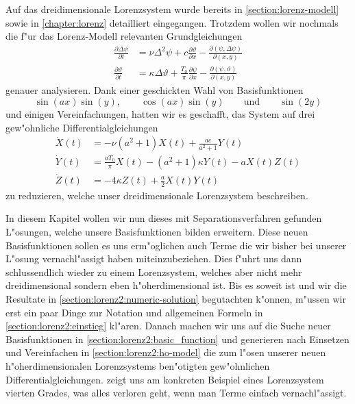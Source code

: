 Auf das dreidimensionale Lorenzsystem wurde bereits in 
\cref{section:lorenz-modell} sowie in \cref{chapter:lorenz} detailliert 
eingegangen. Trotzdem wollen wir nochmals die f"ur das Lorenz-Modell relevanten 
Grundgleichungen
\begin{equation}
	\begin{aligned}
	\frac{\partial\Delta\psi}{\partial t}
	&=
	\nu\Delta^2\psi 
	+c\frac{\partial\vartheta}{\partial x}
	-\frac{\partial(\psi,\Delta\psi)}{\partial(x,y)}
	\\
	\frac{\partial\vartheta}{\partial t}
	&=
	\kappa\Delta\vartheta
	+ \frac{T_0}{\pi}\frac{\partial\psi}{\partial x}
	- \frac{\partial(\psi,\vartheta)}{\partial(x,y)}
	\end{aligned}
	\label{equation:lorenz2:base}
\end{equation}
genauer analysieren. Dank einer geschickten Wahl von Basisfunktionen
\begin{equation*}
	\sin(ax)\sin(y),
	\qquad
	\cos(ax)\sin(y)
	\qquad\text{und}\qquad
	\sin(2y)
\end{equation*}
und einigen Vereinfachungen, hatten wir es geschafft, das System auf drei 
gew"ohnliche Differentialgleichungen
\begin{equation*}
	\begin{aligned}
	\dot X(t)
	&=
	-\nu(a^2+1)X(t)
	+\frac{ac}{a^2+1}Y(t)
	\\
	\dot Y(t)
	&=
	\frac{aT_0}{\pi}X(t)
	-(a^2+1)\kappa Y(t)
	-aX(t)Z(t)
	\\
	\dot Z(t)
	&=
	-4\kappa Z(t)
	+\frac{a}{2}X(t)Y(t)
	\end{aligned}
\end{equation*}
zu reduzieren, welche unser dreidimensionale Lorenzsystem beschreiben.

In diesem Kapitel wollen wir nun dieses mit Separationsverfahren gefunden 
L"osungen, welche unsere Basisfunktionen bilden erweitern. Diese neuen 
Basisfunktionen sollen es uns erm"oglichen auch Terme die wir bisher bei 
unserer L"osung vernachl"assigt haben miteinzubeziehen. Dies f"uhrt uns dann 
schlussendlich wieder zu einem Lorenzsystem, welches aber nicht mehr 
dreidimensional sondern eben h"oherdimensional ist. Bis es soweit ist und wir 
die Resultate in \cref{section:lorenz2:numeric-solution} begutachten k"onnen, 
m"ussen wir erst ein paar Dinge zur Notation und allgemeinen Formeln in 
\cref{section:lorenz2:einstieg} kl"aren. Danach machen wir uns auf die Suche 
neuer Basisfunktionen in \cref{section:lorenz2:basic_function} und generieren 
nach Einsetzen und Vereinfachen in \cref{section:lorenz2:ho-model} die zum 
l"osen unserer neuen h"oherdimensionalen Lorenzsystems ben"otigten 
gew"ohnlichen Differentialgleichungen.  
zeigt uns am konkreten Beispiel eines Lorenzsystem vierten Grades, was alles 
verloren geht, wenn man Terme einfach vernachl"assigt.
